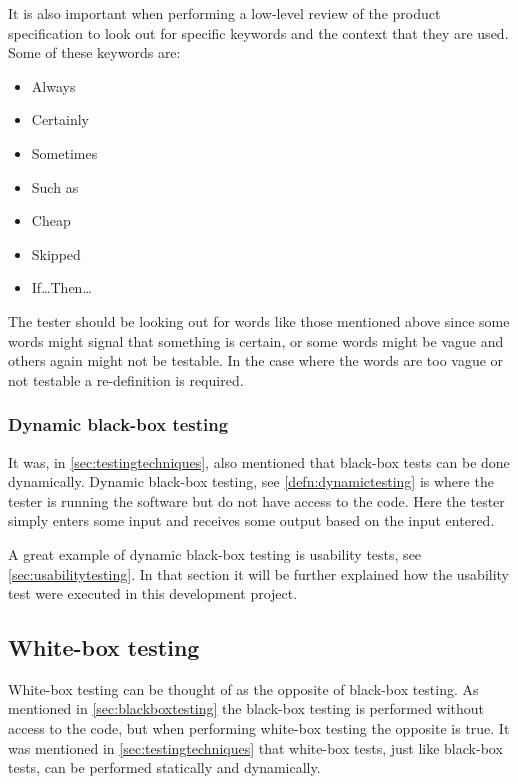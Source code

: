 \documentclass[../../master.tex]{subfiles}
\begin{document}
It is also important when performing a low-level review of the product specification to look out for specific keywords and the context that they are used.
Some of these keywords are:

\begin{multicols}{2}
\begin{itemize}
	\item Always
	\item Certainly
	\item Sometimes
	\item Such as
	\item Cheap
	\item Skipped
	\item If\ldots Then\ldots
\end{itemize}
\end{multicols}

The tester should be looking out for words like those mentioned above since some words might signal that something is certain, or some words might be vague and others again might not be testable.
In the case where the words are too vague or not testable a re-definition is required. \cite{SoftwareTesting}

\subsubsection{Dynamic black-box testing}
It was, in \cref{sec:testingtechniques}, also mentioned that black-box tests can be done dynamically.
Dynamic black-box testing, see \cref{defn:dynamictesting} is where the tester is running the software but do not have access to the code.
Here the tester simply enters some input and receives some output based on the input entered. \cite{SoftwareTesting}

A great example of dynamic black-box testing is usability tests, see \cref{sec:usabilitytesting}.
In that section it will be further explained how the usability test were executed in this development project.

\subsection{White-box testing} \label{sec:whiteboxtesting}
White-box testing can be thought of as the opposite of black-box testing.
As mentioned in \cref{sec:blackboxtesting} the black-box testing is performed without access to the code, but when performing white-box testing the opposite is true.
It was mentioned in \cref{sec:testingtechniques} that white-box tests, just like black-box tests, can be performed statically and dynamically.
\end{document}
